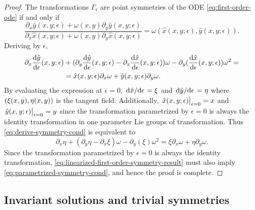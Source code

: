 \begin{proof}
  The transformations \(\Gamma_\epsilon\) are point symmetries of the ODE \ref{eq:first-order-ode} if and only if
  \begin{equation} \label{eq:parametrized-symmetry-cond}
    \frac{\partial_x \hat{y}(x,y;\epsilon) + \omega(x,y) \partial_y \hat{y}(x,y;\epsilon)}{\partial_x \hat{x}(x,y;\epsilon) + \omega(x,y) \partial_y \hat{x}(x,y;\epsilon)} = \omega(\hat{x}(x,y;\epsilon),\hat{y}(x,y;\epsilon)).
  \end{equation}
  Deriving by \(\epsilon\),
  \begin{equation}
    \begin{split} \label{eq:derive-symmetry-cond}
      \partial_x \dv{\hat{y}}{\epsilon}{(x,y;\epsilon)} &+ (\partial_y \dv{\hat{y}}{\epsilon}{(x,y;\epsilon)} - \partial_x \dv{\hat{x}}{\epsilon}{(x,y;\epsilon)}) \omega - \partial_y (\dv{\hat{x}}{\epsilon}{(x,y;\epsilon)}) \omega^2 =\\
      &= \hat{x}(x,y;\epsilon) \partial_x \omega + \hat{y}(x,y;\epsilon) \partial_y \omega.
    \end{split}
  \end{equation}
  By evaluating the expression at \(\epsilon = 0\), \(\dv*{\hat{x}}{\epsilon} = \xi\) and \(\dv*{\hat{y}}{\epsilon} = \eta\) where \(\pqty{\xi(x,y), \eta(x,y)}\) is the tangent field.
  Additionally, \(\eval{\hat{x}(x,y;\epsilon)}_{\epsilon = 0} = x\) and \(\eval{\hat{y}(x,y;\epsilon)}_{\epsilon = 0} = y\) since the transformation parametrized by \(\epsilon = 0\) is always the identity transformation in one parameter Lie groups of transformation.
  Thus \cref{eq:derive-symmetry-cond} is equivalent to
  \begin{equation} \label{eq:linearized-first-order-symmetry-result}
    \partial_x \eta + (\partial_y \eta - \partial_x \xi) \omega - \partial_y (\xi) \omega^2 =
    \xi \partial_x \omega + \eta \partial_y \omega.
  \end{equation}
  Since the transformation parametrized by \(\epsilon = 0\) is always the identity transformation, \cref{eq:linearized-first-order-symmetry-result} must also imply \cref{eq:parametrized-symmetry-cond}, and hence the proof is complete.
\end{proof}

\subsection{Invariant solutions and trivial symmetries}

